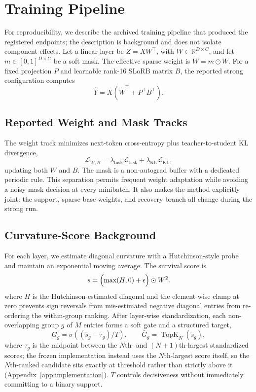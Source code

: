 \documentclass{article}
\begin{document}
\section{Training Pipeline}\label{sec:method}
For reproducibility, we describe the archived training pipeline that produced the registered endpoints; the description is background and does not isolate component effects. Let a linear layer be $Z=XW^\top$, with $W\in\mathbb{R}^{D\times C}$, and let $m\in[0,1]^{D\times C}$ be a soft mask. The effective sparse weight is $\widetilde W=m\odot W$. For a fixed projection $P$ and learnable rank-16 SLoRB matrix $B$, the reported strong configuration computes
\begin{equation}
\widehat Y=X(\widetilde W^\top+P^\top B^\top).
\end{equation}

\subsection{Reported Weight and Mask Tracks}
The weight track minimizes next-token cross-entropy plus teacher-to-student KL divergence,
\begin{equation}
\mathcal{L}_{W,B}=\lambda_{\mathrm{task}}\mathcal{L}_{\mathrm{task}}+\lambda_{\mathrm{KL}}\mathcal{L}_{\mathrm{KL}},
\end{equation}
updating both $W$ and $B$. The mask is a non-autograd buffer with a dedicated periodic rule. This separation permits frequent weight adaptation while avoiding a noisy mask decision at every minibatch. It also makes the method explicitly joint: the support, sparse base weights, and recovery branch all change during the strong run.

\subsection{Curvature-Score Background}
For each layer, we estimate diagonal curvature with a Hutchinson-style probe~\citep{hutchinson1990trace} and maintain an exponential moving average. The survival score is
\begin{equation}
s=\Bigl(\max(H,0)+\epsilon\Bigr)\odot W^2.
\end{equation}
where $H$ is the Hutchinson-estimated diagonal and the element-wise clamp at zero prevents sign reversals from mis-estimated negative diagonal entries from re-ordering the within-group ranking.
After layer-wise standardization, each non-overlapping group $g$ of $M$ entries forms a soft gate and a structured target,
\begin{equation}
G_g=\sigma\!\left((\widetilde s_g-\tau_g)/T\right),\qquad
\bar G_g=\operatorname{TopK}_{N}(\widetilde s_g),
\end{equation}
where $\tau_g$ is the midpoint between the $N$th- and $(N{+}1)$th-largest standardized scores; the frozen implementation instead uses the $N$th-largest score itself, so the $N$th-ranked candidate sits exactly at threshold rather than strictly above it (Appendix~\ref{app:implementation}). $T$ controls decisiveness without immediately committing to a binary support.
\end{document}
